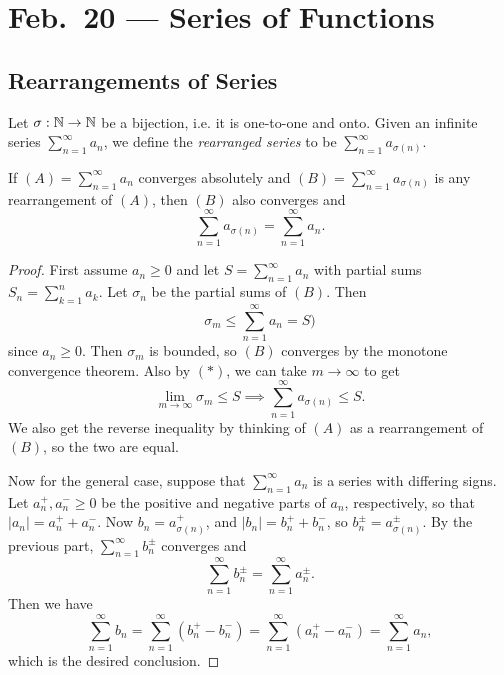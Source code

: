 \chapter{Feb.~20 --- Series of Functions}

\section{Rearrangements of Series}

\begin{definition}
  Let $\sigma : \mathbb{N} \to \mathbb{N}$ be a bijection, i.e. it is
  one-to-one and onto. Given an
  infinite series $\sum_{n = 1}^\infty a_n$, we define
  the \emph{rearranged series} to be $\sum_{n = 1}^\infty a_{\sigma(n)}$.
\end{definition}

\begin{theorem}[Dirichlet]
  If $(A) = \sum_{n = 1}^\infty a_n$ converges absolutely
  and $(B) = \sum_{n = 1}^\infty a_{\sigma(n)}$ is any
  rearrangement of $(A)$, then $(B)$ also converges and
  \[
    \sum_{n = 1}^\infty a_{\sigma(n)} = \sum_{n = 1}^\infty a_n.
  \]
\end{theorem}

\begin{proof}
  First assume $a_n \ge 0$ and let $S = \sum_{n = 1}^\infty a_n$
  with partial sums $S_n = \sum_{k = 1}^n a_k$. Let
  $\sigma_n$ be the partial sums of $(B)$. Then
  \[
    \sigma_m \le \sum_{n = 1}^\infty a_n = S \tag{$*$}) \]
  since $a_n \ge 0$. Then $\sigma_m$ is bounded,
  so $(B)$ converges by the monotone convergence theorem.
  Also by $(*)$, we can take $m \to \infty$ to get
  \[
    \lim_{m \to \infty} \sigma_m \le S
    \implies \sum_{n = 1}^\infty a_{\sigma(n)} \le S.
  \]
  We also get the reverse inequality by thinking
  of $(A)$ as a rearrangement of $(B)$, so the two
  are equal.

  Now for the general case, suppose that
  $\sum_{n = 1}^\infty a_n$ is a series with differing
  signs. Let $a_n^+, a_n^- \ge 0$ be the positive
  and negative parts of $a_n$, respectively, so
  that $|a_n| = a_n^+ + a_n^-$. Now $b_n = a_{\sigma(n)}^+$,
  and $|b_n| = b_n^+ + b_n^-$, so
  $b_n^{\pm} = a_{\sigma(n)}^{\pm}$. By the previous
  part, $\sum_{n = 1}^\infty b_n^{\pm}$ converges and
  \[
    \sum_{n = 1}^\infty b_n^{\pm} = \sum_{n = 1}^\infty a_n^{\pm}.
  \]
  Then we have
  \[
    \sum_{n = 1}^\infty b_n
    = \sum_{n = 1}^\infty (b_n^+ - b_n^-)
    = \sum_{n = 1}^\infty (a_n^+ - a_n^-)
    = \sum_{n = 1}^\infty a_n,
  \]
  which is the desired conclusion.
\end{proof}

